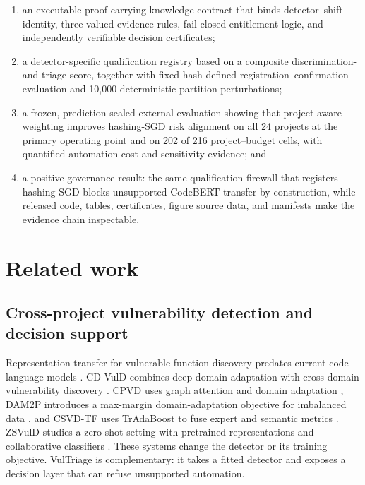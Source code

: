 \documentclass[preprint,12pt]{elsarticle}
\newcommand{\method}{VulTriage\xspace}
\begin{document}
\begin{enumerate}
  \item an executable proof-carrying knowledge contract that binds detector--shift identity, three-valued evidence rules, fail-closed entitlement logic, and independently verifiable decision certificates;
  \item a detector-specific qualification registry based on a composite discrimination-and-triage score, together with fixed hash-defined registration--confirmation evaluation and 10,000 deterministic partition perturbations;
  \item a frozen, prediction-sealed external evaluation showing that project-aware weighting improves hashing-SGD risk alignment on all 24 projects at the primary operating point and on 202 of 216 project--budget cells, with quantified automation cost and sensitivity evidence; and
  \item a positive governance result: the same qualification firewall that registers hashing-SGD blocks unsupported CodeBERT transfer by construction, while released code, tables, certificates, figure source data, and manifests make the evidence chain inspectable.
\end{enumerate}

\section{Related work}

\subsection{Cross-project vulnerability detection and decision support}

Representation transfer for vulnerable-function discovery predates current code-language models \cite{lin2018transfer}. CD-VulD combines deep domain adaptation with cross-domain vulnerability discovery \cite{liu2022cdvuld}. CPVD uses graph attention and domain adaptation \cite{zhang2023cpvd}, DAM2P introduces a max-margin domain-adaptation objective for imbalanced data \cite{nguyen2024dam2p}, and CSVD-TF uses TrAdaBoost to fuse expert and semantic metrics \cite{cai2024csvdtf}. ZSVulD studies a zero-shot setting with pretrained representations and collaborative classifiers \cite{haque2026zsvuld}. These systems change the detector or its training objective. \method is complementary: it takes a fitted detector and exposes a decision layer that can refuse unsupported automation.
\end{document}
